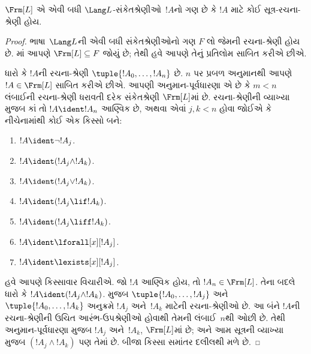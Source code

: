 \begin{thm}
$\Frm[L]$ એ એવી બધી $\Lang L$-સંકેતશ્રેણીઓ~$!A$નો ગણ છે કે
$!A$ માટે કોઈ સૂત્ર-રચના-શ્રેણી હોય.
\end{thm}

\begin{proof}
ભાષા~$\Lang L$ની એવી બધી સંકેતશ્રેણીઓનો ગણ $F$ લો જેમની
રચના-શ્રેણી હોય છે. માં આપણે
$\Frm[L] \subseteq F$ જોયું છે; તેથી હવે આપણે તેનું પ્રતિલોમ
સાબિત કરીએ છીએ.

ધારો કે $!A$ની રચના-શ્રેણી $\tuple{!A_0,\dotsc,!A_n}$ છે. $n$ પર
પ્રબળ અનુમાનથી આપણે $!A \in \Frm[L]$ સાબિત કરીએ છીએ. આપણી
અનુમાન-પૂર્વધારણા એ છે કે $m < n$ લંબાઈની રચના-શ્રેણી ધરાવતી દરેક
સંકેતશ્રેણી $\Frm[L]$માં છે. રચના-શ્રેણીની વ્યાખ્યા મુજબ કાં તો
$!A \ident !A_n$ આણ્વિક છે, અથવા એવાં $j,k < n$ હોવા જોઈએ કે
નીચેનામાંથી કોઈ એક કિસ્સો બને:
\begin{enumerate}
    \item $!A \ident \lnot !A_j$.%
    \item $!A \ident (!A_j \land !A_k)$.%
    \item $!A \ident (!A_j \lor !A_k)$.%
    \item $!A \ident (!A_j \lif !A_k)$.%
    \item $!A \ident (!A_j \liff !A_k)$.%
    \item $!A \ident \lforall[x][!A_j]$.%
    \item $!A \ident \lexists[x][!A_j]$.%
\end{enumerate}
હવે આપણે કિસ્સાવાર વિચારીએ. જો $!A$ આણ્વિક હોય, તો
$!A_n \in \Frm[L]$. તેના બદલે ધારો કે
$!A \ident (!A_j \land !A_k)$. 
મુજબ $\tuple{!A_0,\dotsc,!A_j}$ અને $\tuple{!A_0,\dotsc,!A_k}$ અનુક્રમે
$!A_j$ અને~$!A_k$ માટેની રચના-શ્રેણીઓ છે. આ બંને $!A$ની
રચના-શ્રેણીની ઉચિત આરંભ-ઉપશ્રેણીઓ હોવાથી તેમની લંબાઈ~$n$થી ઓછી છે.
તેથી અનુમાન-પૂર્વધારણા મુજબ $!A_j$ અને~$!A_k$, $\Frm[L]$માં છે;
અને આમ સૂત્રની વ્યાખ્યા મુજબ $(!A_j \land !A_k)$ પણ તેમાં છે.
બીજા કિસ્સા સમાંતર દલીલથી મળે છે.
\end{proof}

